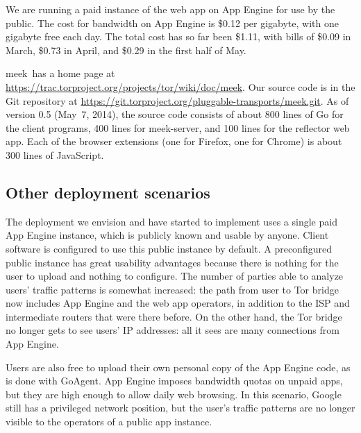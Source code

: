 \documentclass[conference]{IEEEtran}
\def\meekserver{\mbox{meek-server}}
\def\meek{meek}
\begin{document}

We are running a paid instance of the web app on App Engine for use by the public.
The cost for bandwidth on App Engine is \$0.12 per gigabyte,
with one gigabyte free each day.
The total cost has so far been \$1.11, with bills of
\$0.09 in March,
\$0.73 in April,
and \$0.29 in the first half of May.

\meek\ has a home page at
\url{https://trac.torproject.org/projects/tor/wiki/doc/meek}.
Our source code is in the Git repository at
\url{https://git.torproject.org/pluggable-transports/meek.git}.
As of version 0.5 (May~7, 2014), the source code consists of
about 800 lines of Go for the client programs,
400 lines for \meekserver, and
100 lines for the reflector web app.
Each of the browser extensions
(one for Firefox, one for Chrome)
is about 300 lines of JavaScript.

\subsection{Other deployment scenarios}
\label{sec:otherdeployment}

The deployment we envision and have started to implement
uses a single paid App Engine instance, which is publicly known and usable by anyone.
Client software is configured to use this public instance by default.
A preconfigured public instance has great usability advantages
because there is nothing for the user to upload and nothing to configure.
The number of parties able to analyze users' traffic patterns is somewhat increased:
the path from user to Tor bridge now includes App Engine and the web app operators,
in addition to the ISP and intermediate routers that were there before.
On the other hand, the Tor bridge no longer gets to see users' IP addresses:
all it sees are many connections from App Engine.

Users are also free to upload their own personal copy of the App Engine code, as is done with GoAgent.
App Engine imposes bandwidth quotas on unpaid apps, but they are high enough to allow daily web browsing.
In this scenario, Google still has a privileged network position,
but the user's traffic patterns are no longer visible to the operators of a public app instance.

\end{document}
